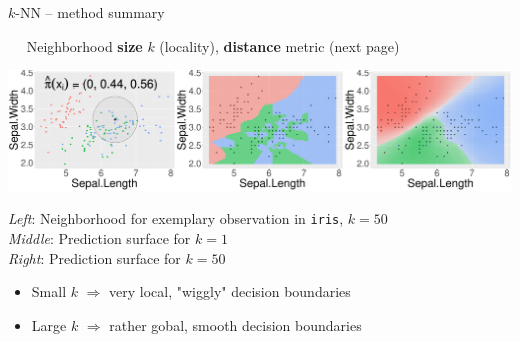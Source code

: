 \begin{frame}{$k$-NN -- method summary}

\vspace{1.5cm}

 ~~ Neighborhood \textbf{size} $k$ (locality), 
\textbf{distance} metric (next page)


\begin{minipage}{0.7\textwidth}
  \includegraphics[width=\textwidth]{figure/knn-neighborhood.pdf}
\end{minipage}%
\hfill
\begin{minipage}{0.25\textwidth}
  \tiny
  \raggedright
  \textit{Left}: Neighborhood for exemplary observation in \texttt{iris}, 
  $k = 50$ \\
  \textit{Middle}: Prediction surface for $k = 1$\\
  \textit{Right}: Prediction surface for $k = 50$
\end{minipage}

\medskip

\begin{itemize}
    \item Small $k$ $\Rightarrow$ very local, "wiggly" decision boundaries
    \item Large $k$ $\Rightarrow$ rather gobal, smooth decision boundaries
\end{itemize}

\end{frame}


